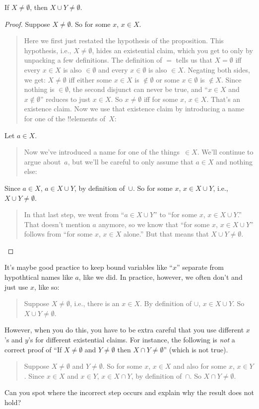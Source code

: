 \documentclass[../../../include/open-logic-section]{subfiles}
\begin{document}
\begin{prop}
If $X \neq \emptyset$, then $X \cup Y \neq \emptyset$.
\end{prop}

\begin{proof}
  Suppose $X \neq \emptyset$. So for some $x$, $x \in X$. 
  \begin{quote}
    Here we first just restated the hypothesis of the
    proposition. This hypothesis, i.e., $X \neq \emptyset$, hides an
    existential claim, which you get to only by unpacking a few
    definitions. The definition of $=$ tells us that $X = \emptyset$
    iff every $x \in X$ is also $\in \emptyset$ and every $x \in
    \emptyset$ is also $\in X$. Negating both sides, we get: $X \neq
    \emptyset$ iff either some $x \in X$ is $\notin \emptyset$ or some
    $x \in \emptyset$ is $\notin X$. Since nothing is $\in \emptyset$,
    the second disjunct can never be true, and ``$x \in X$ and $x
    \notin \emptyset$'' reduces to just $x \in X$. So $x \neq
    \emptyset$ iff for some $x$, $x \in X$. That's an existence
    claim. Now we use that existence claim by introducing a name for
    one of the !!{element}s of~$X$:
  \end{quote}
  Let $a \in X$.
  \begin{quote}
    Now we've introduced a name for one of the things~$\in X$. We'll
    continue to argue about~$a$, but we'll be careful to only assume
    that $a \in X$ and nothing else:
  \end{quote}
  Since $a \in X$, $a \in X \cup Y$, by definition of~$\cup$. So for
  some $x$, $x \in X \cup Y$, i.e., $X \cup Y \neq \emptyset$.
  \begin{quote}
    In that last step, we went from ``$a \in X \cup Y$'' to ``for some
    $x$, $x \in X \cup Y$.'' That doesn't mention $a$ anymore, so we
    know that ``for some $x$, $x \in X \cup Y$'' follows from ``for
    some $x$, $x \in X$ alone.'' But that means that $X \cup Y \neq
    \emptyset$.
  \end{quote}
\end{proof}

It's maybe good practice to keep bound variables like ``$x$'' separate
from hypothtical names like $a$, like we did. In practice, however, we
often don't and just use $x$, like so:
\begin{quote}
Suppose $X \neq \emptyset$, i.e., there is an $x \in X$. By definition
of $\cup$, $x \in X \cup Y$. So $X \cup Y \neq \emptyset$.
\end{quote}
However, when you do this, you have to be extra careful that you use
different $x$'s and $y$'s for different existential claims. For
instance, the following is \emph{not} a correct proof of ``If $X \neq
\emptyset$ and $Y \neq \emptyset$ then $X \cap Y \neq \emptyset$''
(which is not true).
\begin{quote}
Suppose $X \neq \emptyset$ and $Y \neq \emptyset$. So for some $x$, $x
\in X$ and also for some $x$, $x \in Y$. Since $x \in X$ and $x \in
Y$, $x \in X \cap Y$, by definition of~$\cap$. So $X \cap Y \neq
\emptyset$.
\end{quote}
Can you spot where the incorrect step occurs and explain why the
result does not hold?
\end{document}

